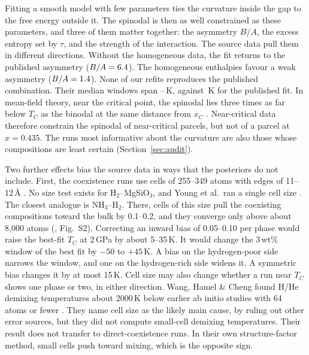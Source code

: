Fitting a smooth model with few parameters ties the curvature inside the gap to the free energy
outside it. The spinodal is then as well constrained as these parameters, and three of them
matter together: the asymmetry $B/A$, the excess entropy set by $\tau$, and the strength of the
interaction. The source data pull them in different directions. Without the homogeneous data, the
fit returns to the published asymmetry ($B/A = 6.4{}$). The homogeneous enthalpies
favour a weak asymmetry ($B/A = 1.4{}$). None of our refits reproduces the published
combination. Their median windows span \IntRangeLo{}--\IntRangeHi{}\,K, against \pubIntTwo{}\,K
for the published fit. In mean-field theory, near the
critical point, the spinodal lies three times as far below $T_C$ as the binodal at the same
distance from $x_C$ \cite{debenedetti1996}. Near-critical data therefore constrain the spinodal
of near-critical parcels, but not of a parcel at $x = 0.435$. The runs most informative about the
curvature are also those whose compositions are least certain (Section~\ref{sec:audit}).

Two further effects bias the source data in ways that the posteriors do not include. First, the
coexistence runs use cells of 255--349 atoms with edges of 11--12\,\AA{} \cite{gilmore2026data}.
No size test exists for H$_2$--MgSiO$_3$, and Young et al.\ ran a single cell size
\cite{young2025}. The closest analogue is NH$_3$--H$_2$. There, cells of this size pull the
coexisting compositions toward the bulk by 0.1--0.2, and they converge only above about 8,000
atoms (\cite{gupta2026}, Fig.~S2). Correcting an inward bias of 0.05--0.10 per phase would raise
the best-fit $T_C$ at 2\,GPa by about 5--35\,K. It would change the 3\,wt\% window of the best
fit by $-50$ to $+45$\,K. A bias on the hydrogen-poor side narrows the window, and one on the
hydrogen-rich side widens it. A symmetric bias changes it by at most 15\,K.
Cell size may also change whether a run near $T_C$ shows one phase or two, in either direction.
Wang, Hamel \& Cheng found H/He demixing temperatures about 2000\,K below earlier ab initio
studies with 64 atoms or fewer \cite{wang2026}. They name cell size as the likely main cause, by
ruling out other error sources, but they did not compute small-cell demixing temperatures. Their
result does not transfer to direct-coexistence runs. In their own structure-factor method, small
cells push toward mixing, which is the opposite sign.

